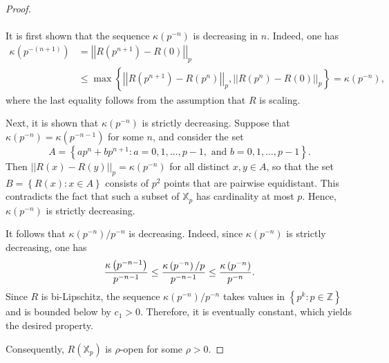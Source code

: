 \documentclass[a4paper, 12pt]{article}
\theoremstyle{definition}
\begin{document}
\begin{proof}
		
		
		
		\paragraph{} 
		
		It is first shown that the sequence $\kappa \left(  p^{-n}  \right) $ is decreasing in $n$. Indeed, one has
		\begin{align*}
			\kappa \left(  p^{- \left(  n+1  \right) }  \right)    &=    \left| \left|  R \left(  p^{n+1}  \right)  - R \left(  0  \right)   \right|  \right|_{p}  \\ 
			&\le   \max \left\{   \left| \left|  R \left(  p^{n+1}  \right)  - R \left(  p^{n}  \right)   \right|  \right|_{p},  \left| \left|  R \left(  p^{n}  \right)  - R \left(  0  \right)   \right|  \right|_{p}  \right\}     =   \kappa \left(  p^{-n}  \right) , 
		\end{align*}
		where the last equality follows from the assumption that $R$ is scaling. 
		
		
		Next, it is shown that $\kappa \left(  p^{-n}  \right) $ is strictly decreasing. Suppose that $\kappa \left(  p^{-n}  \right)  = \kappa \left(  p^{-n -1}  \right) $ for some $n$, and consider the set  
		$$ A   =     \left\{  a p^{n} + b p^{n+1} :   a = 0, 1, \dots, p-1, \text{ and } b = 0, 1, \dots, p-1  \right\}  . $$ 
		Then $ \left| \left|  R \left(  x  \right)  - R \left(  y  \right)   \right|  \right|_{p} = \kappa \left(  p^{-n}  \right) $ for all distinct $x,y \in A $, so that the set $B =  \left\{  R \left(  x  \right)  :   x \in A  \right\} $ consists of $p^{2}$ points that are pairwise equidistant. This contradicts the fact that such a subset of $\mathbb{X}_{p}$ has cardinality at most $p$. Hence, $\kappa \left(  p^{-n}  \right) $ is strictly decreasing. 
		
		It follows that $\kappa \left(  p^{-n}  \right) / p^{-n}$ is decreasing. Indeed, since $\kappa \left(  p^{-n}  \right) $ is strictly decreasing, one has 
		$$ {\kappa \left(  p^{-n -1}  \right)  \over p^{-n -1} }   \le   { \kappa \left(  p^{-n}  \right) / p \over p^{-n - 1} }   \le   { \kappa \left(  p^{-n}  \right)  \over p^{-n}} . $$
		Since $R$ is bi-Lipschitz, the sequence $\kappa \left(  p^{-n}  \right)  / p^{-n}$ takes values in $ \left\{  p^{k} :   p \in \mathbb{Z}  \right\} $ and is bounded below by $c_{1} > 0$. Therefore, it is eventually constant, which yields the desired property. 
		
		Consequently, $R(\mathbb{X}_{p})$ is $\rho$-open for some $\rho>0$. 
		
		
		
		
		
		
		
	\end{proof}
	
\end{document}
